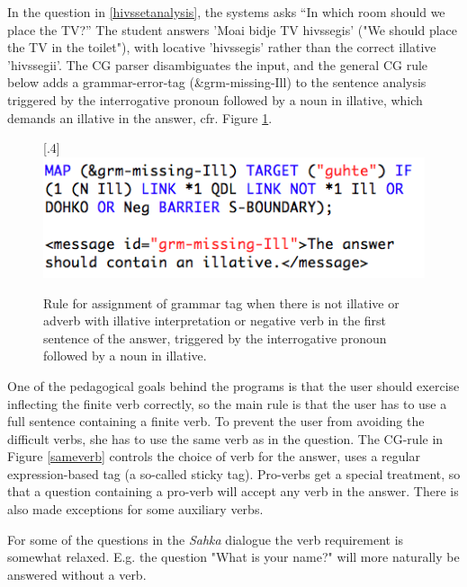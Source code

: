 \documentclass[11pt]{article}
\begin{document}
In the question in \ref{hivssetanalysis}, the systems asks “In which room should we place the TV?” The student answers 'Moai bidje TV hivssegis' ("We should place the TV in the toilet"), with locative 'hivssegis' rather than the correct illative 'hivssegii'. The CG parser disambiguates the input, and the general CG rule below adds a grammar-error-tag (\&grm-missing-Ill) to the sentence analysis triggered by the interrogative pronoun followed by a noun in illative, which demands an illative in the answer, cfr. Figure \ref{missingill}.


\begin{figure}[htbp]
\begin{center}
\scalebox{.4}[.4]{\includegraphics{presentation/img/missingIll.png}}\\
\caption{Rule for assignment of grammar tag when there is not illative or adverb with illative interpretation or negative verb in the first sentence of the answer, triggered by the interrogative pronoun followed by a noun in illative.}
\label{missingill}
\end{center}
\end{figure}

One of the pedagogical goals behind the programs is that the user should exercise inflecting the finite verb correctly, so the main rule is that the user has to use a full sentence containing a finite verb. To prevent the user from avoiding the difficult verbs, she has to use the same verb as in the question. The CG-rule in Figure \ref{sameverb} controls the choice of verb for the answer, uses a regular expression-based tag (a so-called sticky tag). Pro-verbs get a special treatment, so that a question containing a pro-verb will accept any verb in the answer. There is also made exceptions for some auxiliary verbs.

For some of the questions in the \textit{Sahka} dialogue the verb requirement is somewhat relaxed. E.g. the question "What is your name?" will more naturally be answered without a verb.  
\end{document}
